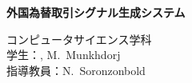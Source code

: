 \thispagestyle{plain}

\captionsetup{list=no, textfont=up}

\renewcommand{\figurename}{図}
\renewcommand{\tablename}{表}

\vspace*{-6mm}
\begin{center}
\textbf{\large 外国為替取引シグナル生成システム}\\[1mm]
\end{center}

\begin{flushright}
コンピュータサイエンス学科\\
学生：\studentID, M.~Munkhdorj\\
指導教員：N.~Soronzonbold
\end{flushright}

